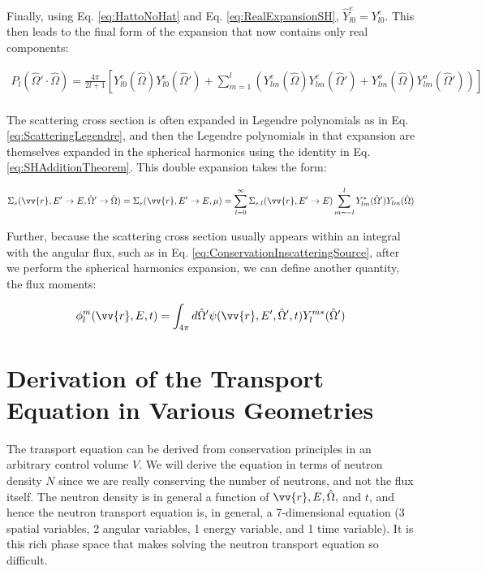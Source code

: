 \documentclass[10pt]{article}
\begin{document}
\begin{flushleft}
Finally, using Eq. \eqref{eq:HattoNoHat} and Eq. \eqref{eq:RealExpansionSH}, \(\hat{Y}_{l0}^e=Y_{l0}^e\). This then leads to the final form of the expansion that now contains only real components:

\begin{equation}
\begin{aligned}
\label{eq:FullExpansion5}
P_l(\hat{\Omega}'\cdot\hat{\Omega})=\frac{4\pi}{2l+1}\left\lbrack Y_{l0}^e(\hat{\Omega})Y_{l0}^e(\hat{\Omega}')+\sum_{m=1}^{l}\left(Y_{lm}^e(\hat{\Omega})Y_{lm}^{e}(\hat{\Omega}')+Y_{lm}^o(\hat{\Omega})Y_{lm}^{o}(\hat{\Omega}')\right)\right\rbrack\\
\end{aligned}
\end{equation}





The scattering cross section is often expanded in Legendre polynomials as in Eq. \ref{eq:ScatteringLegendre}, and then the Legendre polynomials in that expansion are themselves expanded in the spherical harmonics using the identity in Eq. \ref{eq:SHAdditionTheorem}. This double expansion takes the form:

\begin{equation}
\label{eq:ScatteringLegendreandSH}
\Sigma_s(\vv{r}, E'\rightarrow E, \hat{\Omega}'\rightarrow\hat{\Omega}) = \Sigma_s(\vv{r}, E'\rightarrow E, \mu) = \sum_{l=0}^{\infty} \Sigma_{s,l}(\vv{r}, E'\rightarrow E) \sum_{m=-l}^{l} Y_{lm}^{*} (\hat{\Omega}') Y_{lm}(\hat{\Omega})
\end{equation}

Further, because the scattering cross section usually appears within an integral with the angular flux, such as in Eq. \ref{eq:ConservationInscatteringSource}, after we perform the spherical harmonics expansion, we can define another quantity, the flux moments:

\begin{equation}
\label{eq:FluxMomentSH}
\phi_l^m(\vv{r}, E, t) = \int_{4\pi}^{} d\hat{\Omega}'\psi(\vv{r}, E', \hat{\Omega}', t)Y_l^{m*}(\hat{\Omega}')
\end{equation}

\section{Derivation of the Transport Equation in Various Geometries}

The transport equation can be derived from conservation principles in an arbitrary control volume \(V\). We will derive the equation in terms of neutron density \(N\) since we are really conserving the number of neutrons, and not the flux itself. The neutron density is in general a function of \(\vv{r}, E, \hat{\Omega}, \) and \(t\), and hence the neutron transport equation is, in general, a 7-dimensional equation (3 spatial variables, 2 angular variables, 1 energy variable, and 1 time variable). It is this rich phase space that makes solving the neutron transport equation so difficult. 


\end{flushleft}
\end{document}
